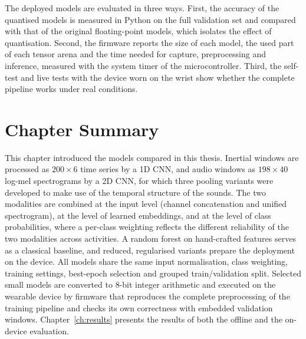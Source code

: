The deployed models are evaluated in three ways. First, the accuracy of the
quantised models is measured in Python on the full validation set and compared
with that of the original floating-point models, which isolates the effect of
quantisation. Second, the firmware reports the size of each model, the used part
of each tensor arena and the time needed for capture, preprocessing and inference,
measured with the system timer of the microcontroller. Third, the self-test and
live tests with the device worn on the wrist show whether the complete pipeline
works under real conditions.

\section{Chapter Summary}
\label{sec:ch4-summary}

This chapter introduced the models compared in this thesis. Inertial windows are
processed as $200 \times 6$ time series by a 1D CNN, and audio windows as
$198 \times 40$ log-mel spectrograms by a 2D CNN, for which three pooling variants
were developed to make use of the temporal structure of the sounds. The two
modalities are combined at the input level (channel concatenation and unified
spectrogram), at the level of learned embeddings, and at the level of class
probabilities, where a per-class weighting reflects the different reliability of
the two modalities across activities. A random forest on hand-crafted features
serves as a classical baseline, and reduced, regularised variants prepare the
deployment on the device. All models share the same input normalisation, class
weighting, training settings, best-epoch selection and grouped train/validation
split. Selected small models are converted to 8-bit integer arithmetic and
executed on the wearable device by firmware that reproduces the complete
preprocessing of the training pipeline and checks its own correctness with
embedded validation windows. Chapter~\ref{ch:results} presents the results of
both the offline and the on-device evaluation.
